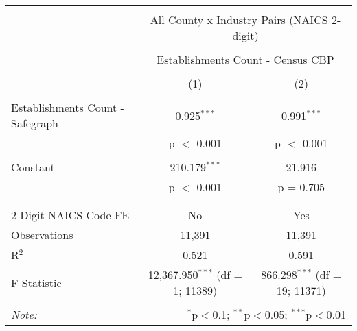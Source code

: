 
\begin{table}[!htbp] \centering 
  \caption{} 
  \label{} 
\begin{tabular}{@{\extracolsep{5pt}}lcc} 
\\[-1.8ex]\hline 
\hline \\[-1.8ex] 
 & \multicolumn{2}{c}{All County x Industry Pairs (NAICS 2-digit)} \\ 
\cline{2-3} 
\\[-1.8ex] & \multicolumn{2}{c}{Establishments Count - Census CBP} \\ 
\\[-1.8ex] & (1) & (2)\\ 
\hline \\[-1.8ex] 
 Establishments Count - Safegraph & 0.925$^{***}$ & 0.991$^{***}$ \\ 
  & p $<$ 0.001 & p $<$ 0.001 \\ 
  & & \\ 
 Constant & 210.179$^{***}$ & 21.916 \\ 
  & p $<$ 0.001 & p = 0.705 \\ 
  & & \\ 
\hline \\[-1.8ex] 
2-Digit NAICS Code FE & No & Yes \\ 
Observations & 11,391 & 11,391 \\ 
R$^{2}$ & 0.521 & 0.591 \\ 
F Statistic & 12,367.950$^{***}$ (df = 1; 11389) & 866.298$^{***}$ (df = 19; 11371) \\ 
\hline 
\hline \\[-1.8ex] 
\textit{Note:}  & \multicolumn{2}{r}{$^{*}$p$<$0.1; $^{**}$p$<$0.05; $^{***}$p$<$0.01} \\ 
\end{tabular} 
\end{table} 
